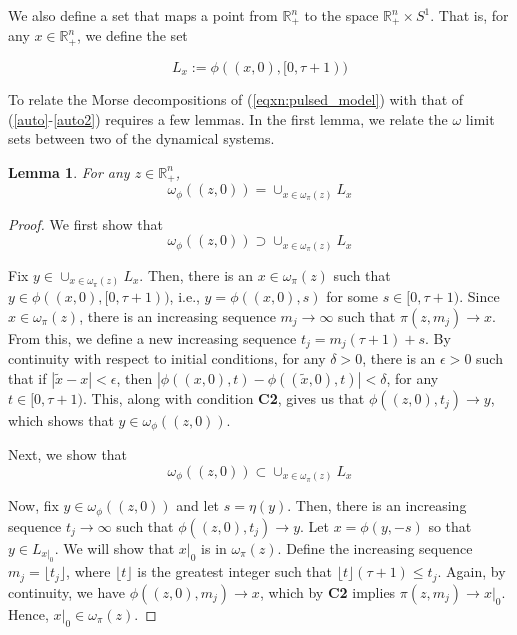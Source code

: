 \documentclass{article}
\newtheorem{lemma}[theorem]{Lemma}
\theoremstyle{definition}
\newcommand{\R}{{\mathbb{R}}}
\begin{document}

We also define a set that maps a point from $\R_+^n$ to the space $\R^n_+ \times S^1$.  That is, for any $x \in \R_+^n$, we define the set


\begin{equation}
    L_x:=  \phi((x,0), [0,\tau+1))
\end{equation}

To relate the Morse decompositions of (\ref{eqxn:pulsed_model}) with that of (\ref{auto}-\ref{auto2}) requires a few lemmas.  In the first lemma, we relate the $\omega$ limit sets between two of the dynamical systems. 


\begin{lemma}\label{omega_points}
    For any $z \in \R^n_+$, $$\omega_\phi((z,0)) = \cup_{x\in \omega_\pi(z)} L_x $$
\end{lemma}

\begin{proof}
We first show that 
$$\omega_\phi((z,0)) \supset \cup_{x\in \omega_\pi(z)} L_x $$

Fix $y\in \cup_{x\in \omega_\pi(z)} L_x$.  Then, there is an $x\in \omega_\pi(z)$ such that $y \in \phi((x,0), [0,\tau+1))$, i.e., $y=\phi((x,0), s)$ for some $s\in [0,\tau+1)$. 
Since $x\in \omega_\pi(z)$, there is an increasing sequence $m_j \rightarrow \infty$ such that $\pi(z, m_j) \rightarrow x$.  From this, we define a new increasing sequence $t_j = m_j(\tau+1) + s$.  By continuity with respect to initial conditions, for any $\delta>0$, there is an $\epsilon>0$ such that if $|\tilde{x} - x|<\epsilon$, then $|\phi((x,0),t) - \phi((\tilde{x},0), t)|<\delta$, for any $t\in [0,\tau+1)$.  This, along with condition \textbf{C2}, gives us that $\phi((z,0),t_j) \rightarrow y$, which shows that $y\in \omega_\phi((z,0))$.

Next, we show that 
$$\omega_\phi((z,0)) \subset \cup_{x\in \omega_\pi(z)} L_x $$

Now, fix $y \in \omega_\phi((z,0))$ and let $s=\eta(y)$.  Then, there is an increasing sequence $t_j\rightarrow \infty $ such that $\phi((z,0),t_j) \rightarrow y$.  Let $x = \phi(y, -s)$ so that $y\in L_{x|_0}$.  We will show that $x|_0$ is in $\omega_\pi(z)$. Define the increasing sequence $m_j = \lfloor t_j \rfloor$, where $\lfloor t \rfloor$ is the greatest integer such that $\lfloor t \rfloor (\tau+1) \leq t_j$. Again, by continuity, we have $\phi((z,0), m_j)\rightarrow x$, which by \textbf{C2} implies $\pi(z, m_j)\rightarrow x|_0$.  Hence, $x|_0 \in \omega_\pi(z).$
\end{proof}
\end{document}
